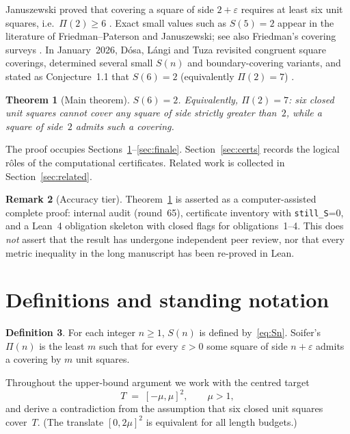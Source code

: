 \documentclass[11pt,reqno]{amsart}
\newtheorem{theorem}{Theorem}[section]
\theoremstyle{definition}
\newtheorem{definition}[theorem]{Definition}
\newtheorem{remark}[theorem]{Remark}
\begin{document}
Januszewski proved that covering a square of side $2+\varepsilon$ requires at
least six unit squares, i.e.\ $\Pi(2)\ge 6$ \cite{Januszewski2009}.
Exact small values such as $S(5)=2$ appear in the literature of
Friedman--Paterson and Januszewski; see also Friedman's covering surveys
\cite{FriedmanPaterson2006,FriedmanCovering}.
In January~2026, D\'osa, L\'angi and Tuza revisited congruent square coverings,
determined several small $S(n)$ and boundary-covering variants, and stated as
Conjecture~1.1 that $S(6)=2$ (equivalently $\Pi(2)=7$) \cite{DLT2026}.

\begin{theorem}[Main theorem]\label{thm:main}
$S(6)=2$.  Equivalently, $\Pi(2)=7$: six closed unit squares cannot cover any
square of side strictly greater than~$2$, while a square of side~$2$ admits such
a covering.
\end{theorem}

The proof occupies Sections~\ref{sec:defs}--\ref{sec:finale}.
Section~\ref{sec:certs} records the logical r\^oles of the computational
certificates.  Related work is collected in Section~\ref{sec:related}.

\begin{remark}[Accuracy tier]
Theorem~\ref{thm:main} is asserted as a computer-assisted complete proof:
internal audit (round~65), certificate inventory with \texttt{still\_S}=0, and
a Lean~4 obligation skeleton with closed flags for obligations~1--4.  This does
\emph{not} assert that the result has undergone independent peer review, nor
that every metric inequality in the long manuscript has been re-proved in Lean.
\end{remark}

\section{Definitions and standing notation}\label{sec:defs}

\begin{definition}
For each integer $n\ge 1$, $S(n)$ is defined by~\eqref{eq:Sn}.
Soifer's $\Pi(n)$ is the least $m$ such that for every $\varepsilon>0$ some
square of side $n+\varepsilon$ admits a covering by $m$ unit squares.
\end{definition}

Throughout the upper-bound argument we work with the centred target
\begin{equation}\label{eq:M1}
T \;=\; [-\mu,\mu]^2,\qquad \mu>1,
\end{equation}
and derive a contradiction from the assumption that six closed unit squares
cover~$T$.  (The translate $[0,2\mu]^2$ is equivalent for all length budgets.)
\end{document}

